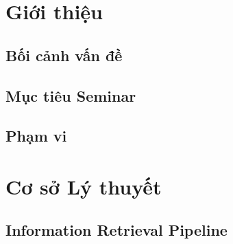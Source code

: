 \documentclass[letterpaper,12pt]{report}
\begin{document}
\clearpage
\tableofcontents

\clearpage
{}
\pagestyle{fancy}

\chapter{Giới thiệu}

\section{Bối cảnh vấn đề}

\section{Mục tiêu Seminar}

\section{Phạm vi}

\chapter{Cơ sở Lý thuyết}

\section{Information Retrieval Pipeline}
\end{document}
